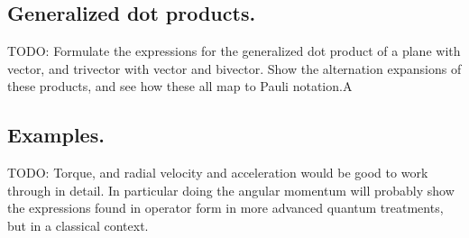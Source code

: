 \documentclass{article}
\begin{document}
\subsection{ Generalized dot products. }

TODO: Formulate the expressions for the generalized dot product of a plane with vector, and trivector with vector and bivector.  Show the alternation expansions of these products, and see how these all map to Pauli notation.A

\subsection{ Examples. }

TODO: Torque, and radial velocity and acceleration would be good to work through in detail.  In particular doing the
angular momentum will probably show the expressions found in operator form in more advanced quantum treatments, but
in a classical context.



\end{document}
